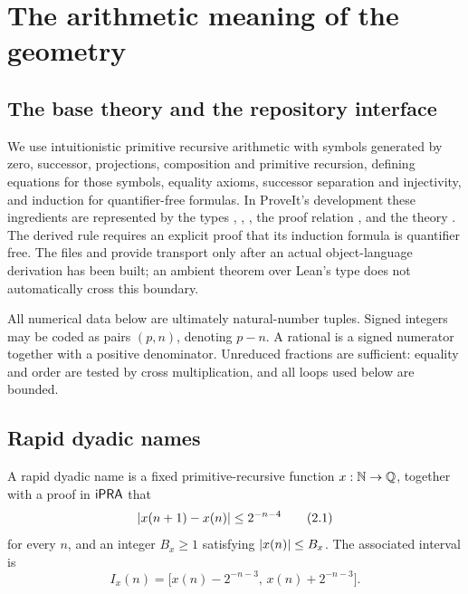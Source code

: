 \section{The arithmetic meaning of the geometry}
\label{sec:ipra}

\subsection{The base theory and the repository interface}

We use intuitionistic primitive recursive arithmetic with symbols generated by
zero, successor, projections, composition and primitive recursion, defining
equations for those symbols, equality axioms, successor separation and
injectivity, and induction for quantifier-free formulas.  In ProveIt's
 development these ingredients are represented by the types
, , , the proof relation , and the
theory .  The derived rule  requires an explicit
proof that its induction formula is quantifier free.  The files
 and  provide
transport only after an actual object-language derivation has been built; an
ambient theorem over Lean's  type does not automatically cross this
boundary.

All numerical data below are ultimately natural-number tuples.  Signed
integers may be coded as pairs \((p,n)\), denoting \(p-n\).  A rational is a
signed numerator together with a positive denominator.  Unreduced fractions
are sufficient: equality and order are tested by cross multiplication, and
all loops used below are bounded.

\subsection{Rapid dyadic names}

\begin{definition}
A rapid dyadic name is a fixed primitive-recursive function
\(x:\mathbb N\to\mathbb Q\), together with a proof in \(\mathsf{iPRA}\) that
\begin{equation}
  \left|x(n+1)-x(n)\right|\le 2^{-n-4}                         \tag{2.1}
\end{equation}
for every \(n\), and an integer \(B_x\ge1\) satisfying
\(\left|x(n)\right|\le B_x\).  The associated interval is
\begin{equation}
 I_x(n)=\bigl[x(n)-2^{-n-3},\,x(n)+2^{-n-3}\bigr].       \tag{2.2}
\end{equation}
\end{definition}

